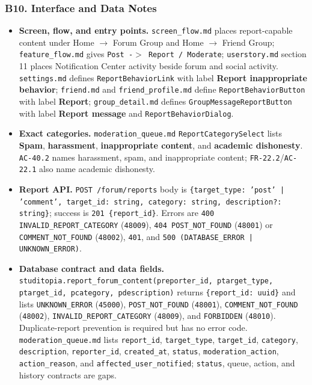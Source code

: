 \documentclass[12pt]{article}
\begin{document}
\hypertarget{sec:b10-interface-and-data-notes}{}
\subsubsection*{B10. Interface and Data Notes}
\par\medskip

\begin{itemize}
\item \textbf{Screen, flow, and entry points.} \texttt{screen\_flow.md} places report-capable content under Home $\rightarrow$ Forum Group and Home $\rightarrow$ Friend Group; \texttt{feature\_flow.md} gives \texttt{Post -$>$ Report / Moderate}; \texttt{userstory.md} section 11 places Notification Center activity beside forum and social activity. \texttt{settings.md} defines \texttt{ReportBehaviorLink} with label \textbf{Report inappropriate behavior}; \texttt{friend.md} and \texttt{friend\_profile.md} define \texttt{ReportBehaviorButton} with label \textbf{Report}; \texttt{group\_detail.md} defines \texttt{GroupMessageReportButton} with label \textbf{Report message} and \texttt{ReportBehaviorDialog}.
\item \textbf{Exact categories.} \texttt{moderation\_queue.md} \texttt{ReportCategorySelect} lists \textbf{Spam}, \textbf{harassment}, \textbf{inappropriate content}, and \textbf{academic dishonesty}. \texttt{AC-40.2} names harassment, spam, and inappropriate content; \texttt{FR-22.2}/\texttt{AC-22.1} also name academic dishonesty.
\item \textbf{Report API.} \texttt{POST /forum/reports} body is \texttt{\{target\_type: 'post' | 'comment', target\_id: string, category: string, description?: string\}}; success is \texttt{201 \{report\_id\}}. Errors are \texttt{400 INVALID\_REPORT\_CATEGORY} (\texttt{48009}), \texttt{404 POST\_NOT\_FOUND} (\texttt{48001}) or \texttt{COMMENT\_NOT\_FOUND} (\texttt{48002}), \texttt{401}, and \texttt{500 (DATABASE\_ERROR | UNKNOWN\_ERROR)}.
\item \textbf{Database contract and data fields.} \texttt{studitopia.report\_forum\_content(preporter\_id, ptarget\_type, ptarget\_id, pcategory, pdescription)} returns \texttt{\{report\_id: uuid\}} and lists \texttt{UNKNOWN\_ERROR} (\texttt{45000}), \texttt{POST\_NOT\_FOUND} (\texttt{48001}), \texttt{COMMENT\_NOT\_FOUND} (\texttt{48002}), \texttt{INVALID\_REPORT\_CATEGORY} (\texttt{48009}), and \texttt{FORBIDDEN} (\texttt{48010}). Duplicate-report prevention is required but has no error code. \texttt{moderation\_queue.md} lists \texttt{report\_id}, \texttt{target\_type}, \texttt{target\_id}, \texttt{category}, \texttt{description}, \texttt{reporter\_id}, \texttt{created\_at}, \texttt{status}, \texttt{moderation\_action}, \texttt{action\_reason}, and \texttt{affected\_user\_notified}; \texttt{status}, queue, action, and history contracts are gaps.

\end{itemize}
\end{document}
